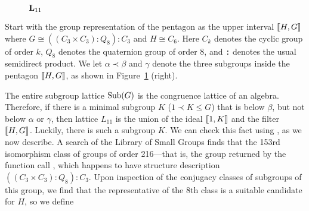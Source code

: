 \begin{figure}[htb]
\begin{center}
  \hskip1cm
\end{center}
\caption{$\mathbf{L}_{11}$}\label{fig:L11}
\end{figure}
Start with the group representation of the pentagon as the upper
interval $\llbracket H, G\rrbracket$ where $G \cong ((C_3 \times C_3) : Q_8) : C_3$ and 
$H \cong C_6$.
Here $C_k$ denotes the cyclic group of order $k$, $Q_8$ denotes the
quaternion group of order 8, and {\tt :} denotes the usual semidirect product.
We let $\alpha \prec \beta$ and $\gamma$ denote the three subgroups inside the
pentagon $\llbracket H, G \rrbracket$, as shown in Figure~\ref{fig:L11} (right).

The entire subgroup lattice $\operatorname{Sub}(G)$ is the congruence lattice of an
algebra. Therefore, if there is a minimal subgroup $K$ ($1 \prec K \leq G$) that
is below $\beta$, but not below  $\alpha$ or $\gamma$, then lattice $L_{11}$ is the 
union of the ideal $\llbracket 1, K\rrbracket$ and the filter $\llbracket H, G\rrbracket$.
Luckily, there is such a subgroup $K$. We can check this fact using \gap, as we now describe.
A search of the \gap Library of Small Groups finds that the 153rd
isomorphism class of groups of order 216---that is, the group 
returned by the function call , which happens to have
structure description $((C_3 \times C_3) : Q_8) : C_3$.
Upon inspection of the conjugacy classes of subgroups of this group, we 
find that the representative of the 8th class is a suitable candidate for 
$H$, so we define 

